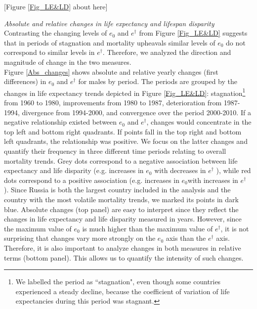 \documentclass{article}
\begin{document}
\begin{spacing}{1.5}
\begin{center}
[Figure \ref{Fig_LE&LD} about here]
\end{center}

\emph{Absolute and relative changes in life expectancy and lifespan disparity}\\


Contrasting the changing levels of $e_0$ and $e^\dagger$ from Figure \ref{Fig_LE&LD} suggests that in periods of stagnation and mortality upheavals similar levels of $e_0$ do not correspond to similar levels in $e^\dagger$. Therefore, we analyzed the direction and magnitude of change in the two measures. \\

Figure \ref{Abs_changes} shows absolute and relative yearly changes (first differences) in $e_0$ and $e^\dagger$ for males by period. The periods are grouped by the changes in life expectancy trends depicted in Figure \ref{Fig_LE&LD}: stagnation\footnote{We labelled the period as ``stagnation", even though some countries experienced a steady decline, because the coefficient of variation of life expectancies during this period was stagnant.} from 1960 to 1980, improvements from 1980 to 1987, deterioration from 1987-1994, divergence from 1994-2000, and convergence over the period 2000-2010.  If a negative relationship existed between $e_0$ and $e^\dagger$, changes would concentrate in the top left and bottom right quadrants. If points fall in the top right and bottom left quadrants, the relationship was positive. We focus on the latter changes and quantify their frequency in three different time periods relating to overall mortality trends. Grey dots correspond to a negative association between life expectancy and life disparity (e.g. increases in $e_0$ with decreases in $e^\dagger$ ), while red dots correspond to a positive association (e.g. increases in $e_0$with increases in $e^\dagger$ ). Since Russia is both the largest country included in the analysis and the country with the most volatile mortality trends, we marked its points in dark blue. Absolute changes (top panel) are easy to interpret since they reflect the changes in life expectancy and life disparity measured in years. However, since the maximum value of $e_0$ is much higher than the maximum value of $e^\dagger$, it is not surprising that changes vary more strongly on the  $e_0$ axis than the $e^\dagger$ axis. Therefore, it is also important to analyze changes in both measures in relative terms (bottom panel).  This allows us to quantify the intensity of such changes.\\



\end{spacing}
\end{document}
